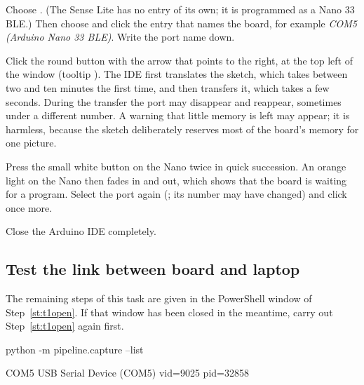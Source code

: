 \label{st:port}
Choose \then{}\then{}\then{}. (The Sense Lite has no entry of its own; it is programmed as a Nano 33 BLE.) Then
choose \then{} and click the entry that names the board, for example
\emph{COM5 (Arduino Nano 33 BLE)}. Write the port name down.

\label{st:upload}
Click the round button with the arrow that points to the right, at the top left of the window
(tooltip ). The IDE first translates the sketch, which takes between two and ten
minutes the first time, and then transfers it, which takes a few seconds. During the transfer
the port may disappear and reappear, sometimes under a different number. A warning that little
memory is left may appear; it is harmless, because the sketch deliberately reserves most of the
board's memory for one picture.

\begin{iffail}
Press the small white button on the Nano twice in quick succession. An orange light on the Nano
then fades in and out, which shows that the board is waiting for a program. Select the port
again (\then{}; its number may have changed) and click  once
more.
\end{iffail}

Close the Arduino IDE completely.

\subsection{Test the link between board and laptop}

The remaining steps of this task are given in the PowerShell window of Step~\ref{st:t1open}. If
that window has been closed in the meantime, carry out Step~\ref{st:t1open} again first.

\begin{ps}
python -m pipeline.capture --list
\end{ps}
\begin{out}
COM5                     USB Serial Device (COM5)  vid=9025 pid=32858
\end{out}

